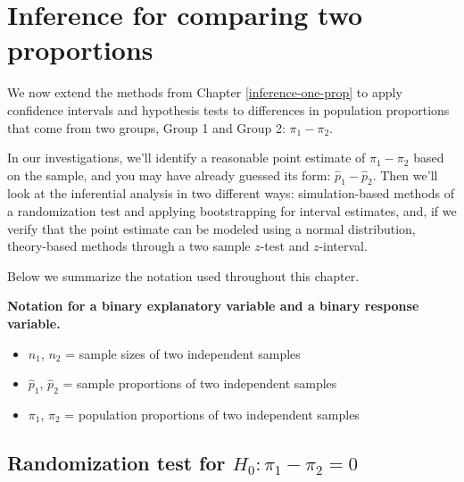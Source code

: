 \documentclass[
  10pt,
  openany]{book}
\providecommand{\tightlist}{%
  \setlength{\itemsep}{0pt}\setlength{\parskip}{0pt}}
\theoremstyle{definition}
\theoremstyle{definition}
\theoremstyle{definition}
\theoremstyle{definition}
\theoremstyle{remark}
\begin{document}
\chapter{Inference for comparing two proportions}\label{inference-two-props}

We now extend the methods from Chapter \ref{inference-one-prop} to apply confidence intervals and hypothesis tests to differences in population proportions that come from two groups, Group 1 and Group 2: \(\pi_1 - \pi_2.\)

In our investigations, we'll identify a reasonable point estimate of \(\pi_1 - \pi_2\) based on the sample, and you may have already guessed its form: \(\hat{p}_1 - \hat{p}_2.\)  Then we'll look at the inferential analysis in two different ways: simulation-based methods of a randomization test and applying bootstrapping for interval estimates, and, if we verify that the point estimate can be modeled using a normal distribution, theory-based methods through a two sample \(z\)-test and \(z\)-interval.

Below we summarize the notation used throughout this chapter.

\textbf{Notation for a binary explanatory variable and a binary response variable.}

\begin{itemize}
\tightlist
\item
  \(n_1\), \(n_2\) = sample sizes of two independent samples
\item
  \(\hat{p}_1\), \(\hat{p}_2\) = sample proportions of two independent samples
\item
  \(\pi_1\), \(\pi_2\) = population proportions of two independent samples
\end{itemize}

\section{\texorpdfstring{Randomization test for \(H_0: \pi_1 - \pi_2 = 0\)}{Randomization test for H\_0: \textbackslash pi\_1 - \textbackslash pi\_2 = 0}}\label{two-prop-errors}
\end{document}
